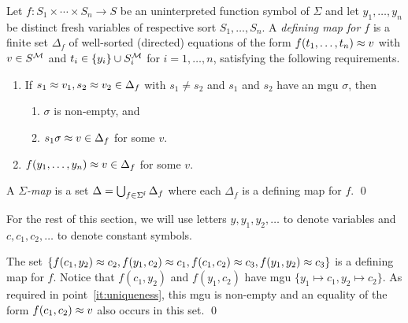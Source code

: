 \documentclass{svjour3}                     %
\begin{document}
\begin{definition}
\label{def:defining-map}
Let $f : S_1 \times \cdots \times S_n \rightarrow S$ be an uninterpreted function symbol
of $\Sigma$ and
let $y_1, \ldots, y_n$ be distinct fresh variables of respective sort $S_1, \ldots, S_n$.
A \emph{defining map for $f$} is a finite set $\Delta_f$ 
of well-sorted (directed) equations of the form $f(t_1,\ldots,t_n) \approx v$ 
with $v \in S^{\mathcal{M}}$ and 
$t_i \in \{y_i\} \cup S_i^{\mathcal{M}}$ for $i=1,\ldots,n$,
satisfying the following requirements.
\begin{enumerate}
\item  \label{it:uniqueness}
If $s_1 \approx v_1, s_2 \approx v_2 \in \Delta_f$ with $s_1 \neq s_2$
and
$s_1$ and $s_2$ have an mgu $\sigma$, then 
\smallskip

\begin{enumerate}
\item
$\sigma$ is non-empty, and 
\smallskip

\item
$s_1\sigma \approx v \in \Delta_f$ for some $v$.
\end{enumerate}
\smallskip

\item \label{it:existence}
$f(y_1, \ldots, y_n) \approx v \in \Delta_f$ for some $v$.
\end{enumerate}
A \emph{$\Sigma$-map} is 
a set $\Delta = \bigcup_{f \in \Sigma^\mathrm{f}} \Delta_f$
where each $\Delta_f$ is a defining map for $f$.
\qed
\end{definition}

For the rest of this section, we will use letters $y, y_1, y_2, \ldots$
to denote variables and $c, c_1, c_2, \ldots$ to denote constant symbols.

\begin{example}
The set $\{ f( c_1, y_2 ) \approx c_2, f( y_1, c_2 ) \approx c_1, f( c_1, c_2 ) \approx c_3, f( y_1, y_2 ) \approx c_3 \}$
is a defining map for $f$.
Notice that $f( c_1, y_2 )$ and $f( y_1, c_2 )$ have mgu $\{ y_1 \mapsto c_1, y_2 \mapsto c_2 \}$.
As required in point~\ref{it:uniqueness}, this mgu is non-empty and an equality of the form $f( c_1, c_2 ) \approx v$ also occurs in this set.
\qed
\end{example}
\end{document}
